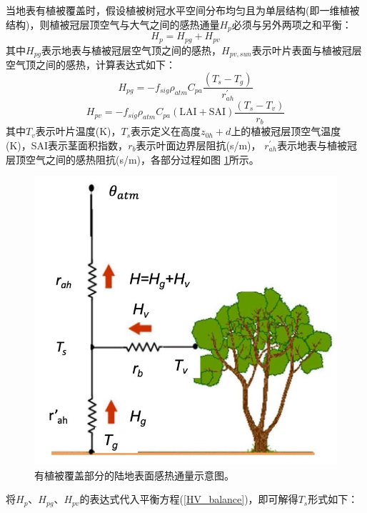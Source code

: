 当地表有植被覆盖时，假设植被树冠水平空间分布均匀且为单层结构(即一维植被结构)，则植被冠层顶空气与大气之间的感热通量$H_p$必须与另外两项之和平衡：
\begin{equation}\label{HV_balance}
H_{p}=H_{p g}+H_{p v}
\end{equation}
其中$H_{pg}$表示地表与植被冠层空气顶之间的感热，$H_{pv,sun}$表示叶片表面与植被冠层空气顶之间的感热，计算表达式如下：
\begin{equation}
H_{p g}=-f_{sig} \rho_{atm} C_{pa} \frac{\left(T_{s}-T_{g}\right)}{r_{a h}^{\prime}}
\end{equation}
\begin{equation}
H_{p v}=-f_{sig} \rho_{atm} C_{pa}(\text {LAI}+\text {SAI}) \frac{\left(T_{s}-T_{v}\right)}{r_{b}}
\end{equation}
其中$T_v$表示叶片温度(K)，$T_s$表示定义在高度$z_{0h}+d$上的植被冠层顶空气温度(K)，SAI表示茎面积指数，$r_b$表示叶面边界层阻抗(s/m)，
$r_{ah}^\prime$表示地表与植被冠层顶空气之间的感热阻抗(s/m)，各部分过程如图 \ref{fig:有植被覆盖部分的陆地表面感热通量示意图}所示。
{
\begin{figure}[]
\centering
\includegraphics{Figures/地表湍流交换过程/有植被覆盖部分的陆地表面感热通量示意图.png}
\caption{有植被覆盖部分的陆地表面感热通量示意图。}
\label{fig:有植被覆盖部分的陆地表面感热通量示意图}
\end{figure}
}
将$H_p$、$H_{pg}$、$H_{pv}$的表达式代入平衡方程(\ref{HV_balance})，即可解得$T_s$形式如下：
